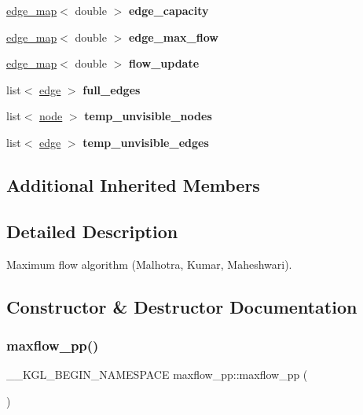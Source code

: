 \begin{DoxyCompactItemize}
\mbox{\hyperlink{classedge__map}{edge\+\_\+map}}$<$ double $>$ {\bfseries edge\+\_\+capacity}
\item 
\mbox{\label{classmaxflow__pp_a25d5bb2ab6c775a634dacf408ff55a83}} 
\mbox{\hyperlink{classedge__map}{edge\+\_\+map}}$<$ double $>$ {\bfseries edge\+\_\+max\+\_\+flow}
\item 
\mbox{\label{classmaxflow__pp_ad37aff831935b2cfd4b03bc4a6da06ce}} 
\mbox{\hyperlink{classedge__map}{edge\+\_\+map}}$<$ double $>$ {\bfseries flow\+\_\+update}
\item 
\mbox{\label{classmaxflow__pp_a55e32031f4f54b5cc934bc0307feca42}} 
list$<$ \mbox{\hyperlink{classedge}{edge}} $>$ {\bfseries full\+\_\+edges}
\item 
\mbox{\label{classmaxflow__pp_adf78e195b91cca1948074d77d535a9a9}} 
list$<$ \mbox{\hyperlink{classnode}{node}} $>$ {\bfseries temp\+\_\+unvisible\+\_\+nodes}
\item 
\mbox{\label{classmaxflow__pp_a5a0ede769352a2f29a261c4ce169cb02}} 
list$<$ \mbox{\hyperlink{classedge}{edge}} $>$ {\bfseries temp\+\_\+unvisible\+\_\+edges}
\end{DoxyCompactItemize}
\subsection*{Additional Inherited Members}


\subsection{Detailed Description}
Maximum flow algorithm (Malhotra, Kumar, Maheshwari). 

\subsection{Constructor \& Destructor Documentation}
\mbox{\label{classmaxflow__pp_a29ec393f72f3289c49a79b0da17e3ccd}} 
\subsubsection{\texorpdfstring{maxflow\+\_\+pp()}{maxflow\_pp()}}
{\footnotesize\ttfamily \+\_\+\+\_\+\+K\+G\+L\+\_\+\+B\+E\+G\+I\+N\+\_\+\+N\+A\+M\+E\+S\+P\+A\+CE maxflow\+\_\+pp\+::maxflow\+\_\+pp (\begin{DoxyParamCaption}{ }\end{DoxyParamCaption})}

